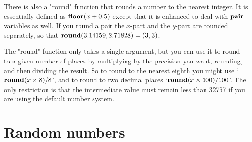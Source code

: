 \documentclass[a4paper,landscape]{article}
\def\kw#1{\begingroup\def\_{\kern.04em
    \vbox{\hrule width.3em height .6pt}\kern.08em}%
\ifmmode\mathop{\textbf{#1}}\else\hbox{\bf#1\/}\fi\endgroup}
\begin{document}
\vfill

There is also a "round" function that rounds a number to the nearest integer.  It is
essentially defined as $\mathop{\kw{floor}}(x+0.5)$ except that it is enhanced to
deal with $\kw{pair}$ variables as well.  If you round a pair the $x$-part and
the $y$-part are rounded separately, so that $\mathop{\kw{round}}(3.14159, 2.71828)
= (3,3)$.

The "round" function only takes a single argument, but you can use it to round to a
given number of places by multiplying by the precision you want, rounding, and then
dividing the result. So to round to the nearest eighth you might use
`$\kw{round}(x\times8)/8$', and to round to two decimal places
`$\kw{round}(x\times100)/100$'.  The only restriction is that the intermediate value
must remain less than 32767 if you are using the default number system.


\newpage
\section{Random numbers}
\end{document}
